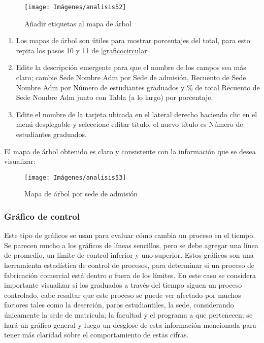 \documentclass[
]{book}
\begin{document}
\begin{figure}

{\centering \texttt{[image: Imágenes/analisis52]} 

}

\caption{Añadir etiquetas al mapa de árbol}\label{fig:paso5mapaarbol-fig}
\end{figure}

\begin{enumerate}
\def\labelenumi{\arabic{enumi}.}
\setcounter{enumi}{5}
\item
  Los mapas de árbol son útiles para mostrar porcentajes del total, para esto repita los pasos 10 y 11 de \ref{graficocircular}.
\item
  Edite la descripción emergente para que el nombre de los campos sea más claro; cambie Sede Nombre Adm por Sede de admisión, Recuento de Sede Nombre Adm por Número de estudiantes graduados y \% de total Recuento de Sede Nombre Adm junto con Tabla (a lo largo) por porcentaje.
\item
  Edite el nombre de la tarjeta ubicada en el lateral derecho haciendo clic en el menú desplegable y seleccione editar título, el nuevo título es Número de estudiantes graduados.
\end{enumerate}

El mapa de árbol obtenido es claro y consistente con la información que se desea visualizar:

\begin{figure}

{\centering \texttt{[image: Imágenes/analisis53]} 

}

\caption{Mapa de árbol por sede de admisión}\label{fig:mapaarbol-fig}
\end{figure}

\hypertarget{graficodecontrol}{%
\subsubsection{Gráfico de control}\label{graficodecontrol}}

Este tipo de gráficos se usan para evaluar cómo cambia un proceso en el tiempo. Se parecen mucho a los gráficos de líneas sencillos, pero se debe agregar una línea de promedio, un límite de control inferior y uno superior. Estos gráficos son una herramienta estadística de control de procesos, para determinar si un proceso de fabricación comercial está dentro o fuera de los límites.
En este caso se considera importante visualizar si los graduados a través del tiempo siguen un proceso controlado, cabe resaltar que este proceso se puede ver afectado por muchos factores tales como la deserción, paros estudiantiles, la sede, considerando únicamente la sede de matrícula; la facultad y el programa a que pertenecen; se hará un gráfico general y luego un desglose de esta información mencionada para tener más claridad sobre el comportamiento de estas cifras.
\end{document}
